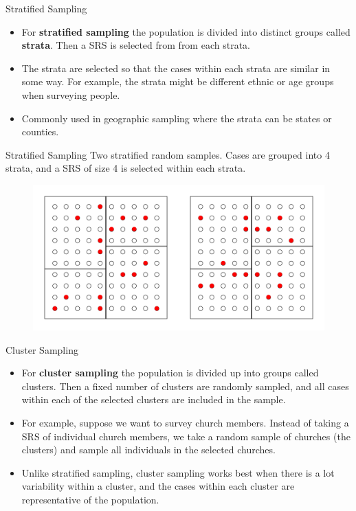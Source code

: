 \documentclass{beamer}
\begin{document}
\begin{frame}{Stratified Sampling}
\begin{itemize}
\item For \textbf{stratified sampling} the population is divided into distinct groups called \textbf{strata}.  Then a SRS is selected from from each strata.
\vspace{5pt}
\item The strata are selected so that the cases within each strata are similar in some way.  For example, the strata might be different ethnic or age groups when surveying people.
\vspace{5pt}
\item Commonly used in geographic sampling where the strata can be states or counties.   
\end{itemize}
\end{frame}

\begin{frame}{Stratified Sampling}
Two stratified random samples.  Cases are grouped into 4 strata, and a SRS of size 4 is selected within each strata. 

\begin{figure}
\includegraphics[scale=0.4]{figure/strat.pdf}
\end{figure}
\end{frame}

\begin{frame}{Cluster Sampling}
\begin{itemize}
\item For \textbf{cluster sampling} the population is divided up into groups called clusters.  Then a fixed number of clusters are randomly sampled, and all cases within each of the selected clusters are included in the sample. 
\vspace{10pt}
\item For example, suppose we want to survey church members.  Instead of taking a SRS of individual church members, we take a random sample of churches (the clusters) and sample all individuals in the selected churches.
\vspace{10pt}
\item Unlike stratified sampling, cluster sampling works best when there is a lot variability within a cluster, and the cases within each cluster are representative of the population.
\end{itemize}
\end{frame}
\end{document}
